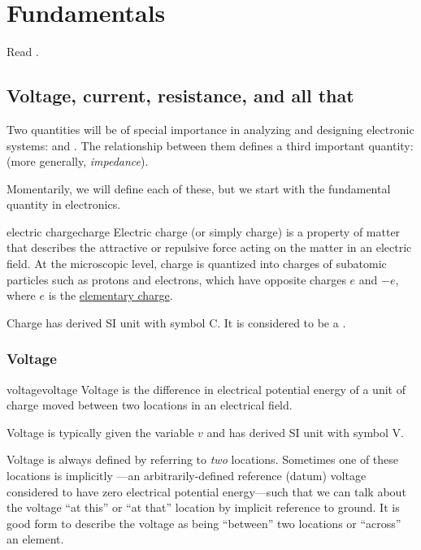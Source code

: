 \documentclass[electronics.tex]{subfiles}
\begin{document}
\chapter{Fundamentals}
\tags{}

Read \cite{Horowitz2015}.

\section{Voltage, current, resistance, and all that}
\tags{}

Two quantities will be of special importance in analyzing and designing electronic systems:  and .
The relationship between them defines a third important quantity:  (more generally, \emph{impedance}).

Momentarily, we will define each of these, but we start with the fundamental quantity in electronics.
\tags{}

\begin{Definition}{electric charge}{charge}
  Electric charge (or simply charge) is a  property of matter that describes the attractive or repulsive force acting on the matter in an electric field. At the microscopic level, charge is quantized into charges of subatomic particles such as protons and electrons, which have opposite charges $e$ and $-e$, where $e$ is the \href{https://en.wikipedia.org/wiki/Elementary_charge}{elementary charge}.
\end{Definition}

Charge has derived SI unit  with symbol C.
It is considered to be a .
\tags{}

\subsection{Voltage}

\begin{Definition}{voltage}{voltage}
  Voltage is the difference in electrical potential energy of a unit of charge moved between two locations in an electrical field.
\end{Definition}

Voltage is typically given the variable $v$ and has derived SI unit  with symbol V.
\tags{}

Voltage is always defined by referring to \emph{two} locations.
Sometimes one of these locations is implicitly ---an arbitrarily-defined reference (datum) voltage considered to have zero electrical potential energy---such that we can talk about the voltage ``at this'' or ``at that'' location by implicit reference to ground.
It is good form to describe the voltage as being ``between'' two locations or ``across'' an element.
\tags{}
\end{document}
